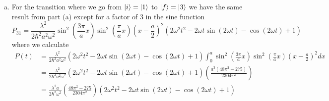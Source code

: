 \documentclass[11pt]{article}
\numberwithin{equation}{section}
\begin{document}
\begin{enumerate}[(a)]
\item
For the transition where we go from $|{i}\rangle = |{1}\rangle$ to $|{f}\rangle = |{3}\rangle$ we have the same result from part (a) except for a factor of $3$ in the sine function
$$P_{31} = \frac{\lambda^2}{2\hbar^2a^2\omega^2}\sin^2\left(\frac{3\pi}{a}x\right)\sin^2\left(\frac{\pi}{a}x\right)\left(x-\frac{a}{2}\right)^2 (2\omega^2t^2 - 2\omega t\sin(2\omega t) - \cos(2\omega t) + 1)$$
where we calculate
\begin{align*}
P(t) &= \frac{\lambda^2}{2\hbar^2a^2\omega^2}(2\omega^2t^2 - 2\omega t\sin(2\omega t) - \cos(2\omega t) + 1)\int_0^a\sin^2\left(\frac{3\pi}{a}x\right)\sin^2\left(\frac{\pi}{a}x\right)\left(x-\frac{a}{2}\right)^2dx \\
&= \frac{\lambda^2}{2\hbar^2a^2\omega^2}(2\omega^2t^2 - 2\omega t\sin(2\omega t) - \cos(2\omega t) + 1)\left(\frac{a^3(48\pi^2-275)}{2304\pi^2}\right)\\
&= \frac{\lambda^2a}{2\hbar^2\omega^2}\left(\frac{48\pi^2-275}{2304\pi^2}\right)(2\omega^2t^2 - 2\omega t\sin(2\omega t) - \cos(2\omega t) + 1)
\end{align*}
\end{enumerate}
\end{document}
